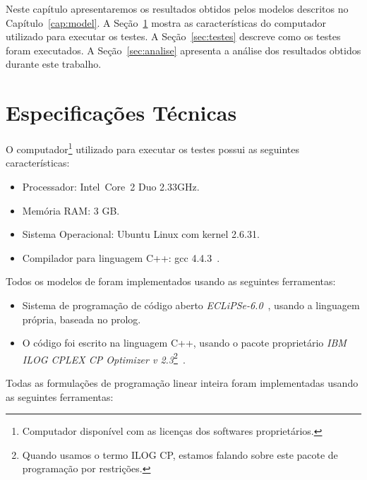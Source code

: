 Neste capítulo apresentaremos os resultados obtidos pelos modelos
descritos no Capítulo~\ref{cap:model}. A Seção~\ref{sec:tspec} mostra as
características do computador utilizado para executar os testes. A
Seção~\ref{sec:testes} descreve como os testes foram executados. A
Seção~\ref{sec:analise} apresenta a análise dos resultados obtidos
durante este trabalho.

\section{Especificações Técnicas}
\label{sec:tspec}
O computador\footnote{Computador disponível com as licenças dos
softwares proprietários.} utilizado para executar os testes possui as
seguintes características:

\begin{itemize}

    \item{Processador: Intel\textregistered{}~Core\texttrademark~2 Duo
        2.33GHz.}

    \item{Memória RAM: 3 GB.}

    \item{Sistema Operacional: Ubuntu Linux com kernel 2.6.31.}

    \item{Compilador para linguagem C++: gcc 4.4.3~\cite{gcc*2012}.}

\end{itemize}

Todos os modelos de \pr{} foram implementados usando as seguintes
ferramentas:

\begin{itemize}
    \item{Sistema de programação de código aberto
        \textit{ECLiPSe-6.0}~\cite{eclipse*2009}, usando a linguagem
        própria, baseada no prolog.}

    \item{O código foi escrito na linguagem C++, usando o pacote
        proprietário \textit{IBM\textregistered{}
        ILOG\textregistered{} CPLEX\textregistered{} CP Optimizer v
        2.3}\footnote{Quando usamos o termo ILOG CP, estamos falando
        sobre este pacote de programação por
        restrições.}~\cite{ilogcp*2011}.}
\end{itemize}

Todas as formulações de programação linear inteira foram implementadas
usando as seguintes ferramentas:

